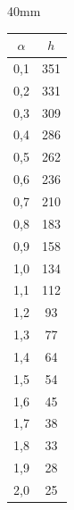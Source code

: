   \begin{floatingfigure}{40mm}


  \vspace*{-2pt}


  {\small


\begin{center}




\vspace*{2ex}





\tabcolsep=20pt


\begin{tabular}{|c|c|}


\hline


$\alpha$&$h$\\


\hline


0,1& 351\\


0,2&331\\


0,3&309\\


0,4&286\\


0,5&262\\


0,6&236\\


0,7&210\\


0,8&183\\


0,9&158\\


1,0&134\\


1,1&112\\


1,2&\hphantom{9}93\\


1,3&\hphantom{9}77\\


1,4&\hphantom{9}64\\


1,5&\hphantom{9}54\\


1,6&\hphantom{9}45\\


1,7&\hphantom{9}38\\


1,8&\hphantom{9}33\\


1,9&\hphantom{9}28\\


2,0&\hphantom{9}25\\


\hline


\end{tabular}


\end{center}}


\vspace*{6pt}


\end{floatingfigure}


